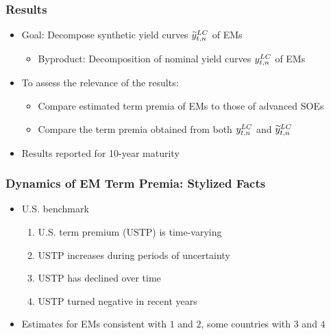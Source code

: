 \documentclass[12pt, aspectratio=169, xcolor=dvipsnames]{beamer} 			         %
\begin{document}
\begin{frame}
	\frametitle{Results}
	\begin{itemize}
		\item Goal: Decompose synthetic yield curves $\widetilde{y}_{t,n} ^{LC}$ of EMs
		\begin{itemize}
			\item Byproduct: Decomposition of nominal yield curves $y_{t,n} ^{LC}$ of EMs
		\end{itemize}
		\item To assess the relevance of the results:
		\begin{itemize}
			\item Compare estimated term premia of EMs to those of advanced SOEs
			\item Compare the term premia obtained from both $y_{t,n} ^{LC}$ and $\widetilde{y}_{t,n} ^{LC}$
		\end{itemize}
		\item Results reported for 10-year maturity
	\end{itemize}
\end{frame}

\begin{frame}
	\frametitle{Dynamics of EM Term Premia: Stylized Facts}
	\begin{itemize}
		\item U.S. benchmark
		\begin{enumerate}
			\item U.S. term premium (USTP) is time-varying
			\item USTP increases during periods of uncertainty
			\item USTP has declined over time
			\item USTP turned negative in recent years
		\end{enumerate}
		\item Estimates for EMs consistent with $1$ and $2$, some countries with $3$ and $4$
	\end{itemize}
\end{frame}
\end{document}
